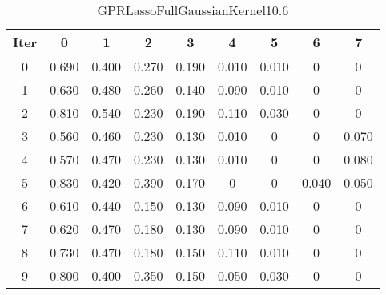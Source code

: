 \begin{table}
	\begin{center}
		\begin{tabular}{|c|c|c|c|c|c|c|c|c|}
			\hline
			Iter & 0 & 1 & 2 & 3 & 4 & 5 & 6 & 7 \\
			\hline
			0 & 0.690 & 0.400 & 0.270 & 0.190 & 0.010 & 0.010 & 0 & 0 \\
			\hline
			1 & 0.630 & 0.480 & 0.260 & 0.140 & 0.090 & 0.010 & 0 & 0 \\
			\hline
			2 & 0.810 & 0.540 & 0.230 & 0.190 & 0.110 & 0.030 & 0 & 0 \\
			\hline
			3 & 0.560 & 0.460 & 0.230 & 0.130 & 0.010 & 0 & 0 & 0.070 \\
			\hline
			4 & 0.570 & 0.470 & 0.230 & 0.130 & 0.010 & 0 & 0 & 0.080 \\
			\hline
			5 & 0.830 & 0.420 & 0.390 & 0.170 & 0 & 0 & 0.040 & 0.050 \\
			\hline
			6 & 0.610 & 0.440 & 0.150 & 0.130 & 0.090 & 0.010 & 0 & 0 \\
			\hline
			7 & 0.620 & 0.470 & 0.180 & 0.130 & 0.090 & 0.010 & 0 & 0 \\
			\hline
			8 & 0.730 & 0.470 & 0.180 & 0.150 & 0.110 & 0.010 & 0 & 0 \\
			\hline
			9 & 0.800 & 0.400 & 0.350 & 0.150 & 0.050 & 0.030 & 0 & 0 \\
			\hline
		\end{tabular}
	\end{center}
	\caption{GPRLassoFullGaussianKernel10.6}
\end{table}